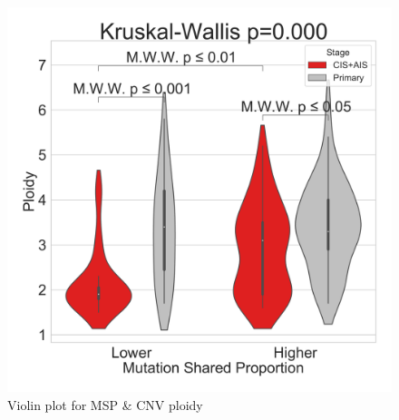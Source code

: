 \documentclass{beamer}
\begin{document}
\begin{frame}[allowframebreaks]
                    \begin{figure}
                        \includegraphics[width=0.4 \linewidth]{figures/MutationSharedProportion_CNV/Ploidy/CopyNumber.BWA.Sequenza.SQC.median/Violin_Mutation Shared Proportion.pdf}
                        \caption{Violin plot for MSP \& CNV ploidy}
                    \end{figure}
                \end{frame}
\end{document}
